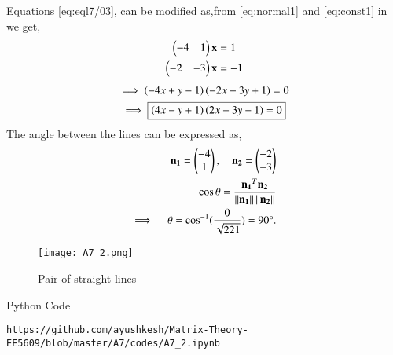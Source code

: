 \documentclass[journal,12pt,twocolumn]{IEEEtran}
\begin{document}
Equations \eqref{eq:eql7/03}, can be modified as,from \eqref{eq:normal1} and \eqref{eq:const1} in we get,
\begin{align}
    \begin{pmatrix}-4 & 1\end{pmatrix}\mathbf{x}&=1\\
    \begin{pmatrix}-2 & -3\end{pmatrix}\mathbf{x}&=-1
\end{align}
\begin{multline}
\implies \left(-4x+y-1\right)\left(-2x-3y+1\right)= 0\\
\implies \boxed{\left(4x-y+1\right)\left(2x+3y-1\right) = 0} \label{eq:line1}
\end{multline}
The angle between the lines can be expressed as, 
\begin{align}
	\mathbf{n_1}=\begin{pmatrix}-4\\1\end{pmatrix} , \quad \mathbf{n_2}=\begin{pmatrix}-2\\-3\end{pmatrix}\\
	\cos\theta=\frac{\mathbf{n_1}^T\mathbf{n_2}}{\left\lVert\mathbf{n_1}\right\rVert\left\lVert\mathbf{n_2}\right\rVert} \\
	\implies \quad \theta=\cos^{-1}({\frac{0}{\sqrt{221}}}) = 90\degree.
\end{align}
\renewcommand{\thefigure}{1}
\begin{figure}[h]
    \centering
    \texttt{[image: A7\_2.png]}
    \caption{Pair of straight lines}
    \label{Fig :2}
\end{figure}
Python Code 
\begin{lstlisting}
https://github.com/ayushkesh/Matrix-Theory-EE5609/blob/master/A7/codes/A7_2.ipynb
\end{lstlisting}
\end{document}
